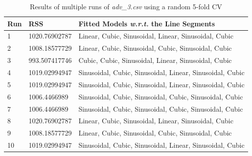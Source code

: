 \documentclass[a4paper,11pt]{article}
\begin{document}
\begin{table}[ht!]
    \begin{minipage}{0.5\linewidth}
    \scriptsize
    \centering
    \caption{Results of multiple runs of \textit{adv\_3.csv} using a random 5-fold CV}
    \label{tab:adv_3_random_cv}
    \begin{tabular}{l l l}
        \toprule
        Run & RSS & Fitted Models \textit{w.r.t.} the Line Segments \\
        \midrule
        1
            & \num{1020.76902787}
            & Linear, Cubic, Sinusoidal, Linear, Sinusoidal, Cubic
        \\
        2
            & \num{1008.18577729}
            & Linear, Cubic, Sinusoidal, Cubic, Sinusoidal, Cubic
        \\
        3
            & \num{993.507417746}
            & Cubic, Cubic, Sinusoidal, Linear, Sinusoidal, Cubic
        \\
        4
            & \num{1019.02994947}
            & Sinusoidal, Cubic, Sinusoidal, Linear, Sinusoidal, Cubic
        \\
        5
            & \num{1019.02994947}
            & Sinusoidal, Cubic, Sinusoidal, Linear, Sinusoidal, Cubic
        \\
        6
            & \num{1006.4466989}
            & Sinusoidal, Cubic, Sinusoidal, Cubic, Sinusoidal, Cubic
        \\
        7
            & \num{1006.4466989}
            & Sinusoidal, Cubic, Sinusoidal, Cubic, Sinusoidal, Cubic
        \\
        8
            & \num{1020.76902787}
            & Linear, Cubic, Sinusoidal, Linear, Sinusoidal, Cubic
        \\
        9
            & \num{1008.18577729}
            & Linear, Cubic, Sinusoidal, Cubic, Sinusoidal, Cubic
        \\
        10
            & \num{1019.02994947}
            & Sinusoidal, Cubic, Sinusoidal, Linear, Sinusoidal, Cubic
        \\
        \bottomrule
    \end{tabular}
    \end{minipage}
    \begin{minipage}{0.5\linewidth}
    \centering

\end{minipage}
\end{table}
\end{document}
